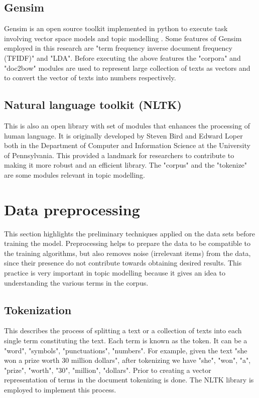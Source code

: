 \subsection{Gensim}
\begin{flushleft}
Gensim is an open source toolkit implemented in python to execute task involving vector space models and topic modelling \cite{rehurek2010software}. Some features of Gensim employed in this research are "term frequency inverse document frequency (TFIDF)" and "LDA". Before executing the above features the "corpora" and "doc2bow" modules are used to represent large collection of texts as vectors and to convert the  vector of texts  into numbers respectively.
\end{flushleft}
\subsection{Natural  language toolkit (NLTK)}
\begin{flushleft}
This is also an open library with set of modules that enhances the processing of human language. It is originally developed by Steven Bird and Edward Loper both in  the Department of Computer and Information Science at the University of Pennsylvania. This provided a landmark for researchers to contribute to making it more robust and an efficient library. The "corpus" and the "tokenize" are some modules relevant in topic modelling.
\end{flushleft}
\section{Data preprocessing}
\begin{flushleft}
This section highlights the preliminary techniques applied on the data sets before training the model. Preprocessing helps to prepare the data to be compatible to the training algorithms, but also removes noise (irrelevant items) from the data, since their presence do not contribute towards obtaining desired results. This practice is very important in topic modelling because it gives an idea to understanding the various terms in the corpus.
\end{flushleft}
\subsection{Tokenization}
\begin{flushleft}
This describes the process of splitting  a text or a collection of texts  into each single term constituting the text. Each term is known as the token. It can be a "word", "symbols", "punctuations", "numbers". For example, given the text "she won a prize worth 30 million dollars", after tokenizing we have "she", "won", "a", "prize", "worth", "30", "million", "dollars". Prior to creating a vector representation of terms in the document tokenizing is done. The NLTK library is employed to implement this process.
\end{flushleft}
